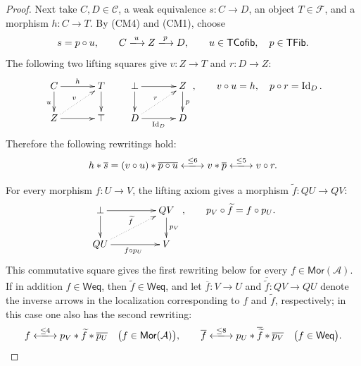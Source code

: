 \documentclass[10pt,a4paper]{amsart}
\theoremstyle{plain}
\theoremstyle{definition}
\theoremstyle{remark}
\begin{document}
\begin{proof}
  Next take $C,D \in \mathcal{C}$, a weak equivalence $s:C\longrightarrow D$, an object $T \in \mathcal{F}$, and a morphism $h:C\longrightarrow T$.
  By (CM4) and (CM1), choose
  \[
    s=p\circ u,\qquad C\xlongrightarrow{u}Z\xlongrightarrow{p}D,\qquad u\in \mathsf{TCofib},\quad p\in \mathsf{TFib}.
  \]
  The following two lifting squares give $v:Z\longrightarrow T$ and $r:D\longrightarrow Z$:
  \[
    \xymatrix@C=12mm@R=7mm{
    C\ar[r]^h\ar[d]_u&T\ar[d]\\
    Z\ar[r]\ar@{..>}[ur]^v&\top
    }
    \qquad
    \xymatrix@C=12mm@R=7mm{
    \bot\ar[r]\ar[d]&Z\ar[d]^p\\
    D\ar[r]_{\operatorname{Id}_D}\ar@{..>}[ur]^r&D
    },
    \qquad
    v\circ u=h,\quad p\circ r=\operatorname{Id}_D.
  \]
  Therefore the following rewritings hold:
  \begin{equation}\label{eq:model-weak-inverse-rewriting}
    h\ast\overline s
    =(v\circ u)\ast\overline{p\circ u}
    \xlongleftrightarrow{\leq6}
    v\ast\overline p
    \xlongleftrightarrow{\leq5}v\circ r.
  \end{equation}

  \medskip

  For every morphism $f:U\longrightarrow V$, the lifting axiom gives a morphism $\widetilde f:QU\longrightarrow QV$:
  \[
    \xymatrix@C=16mm@R=7mm{
    \bot\ar[r]\ar[d]&QV\ar[d]^{p_V}\\
    QU\ar[r]_{f\circ p_U}
    \ar@{..>}[ur]^{\widetilde f}&V
    },
    \qquad
    p_V\circ\widetilde f=f\circ p_U.
  \]
  This commutative square gives the first rewriting below for every $f\in\mathsf{Mor}(\mathcal A)$.
  If in addition $f\in\mathsf{Weq}$, then $\widetilde f\in\mathsf{Weq}$, and let $\overline f:V\longrightarrow U$ and $\overline{\widetilde f}:QV\longrightarrow QU$ denote the inverse arrows in the localization corresponding to $f$ and $\widetilde f$, respectively; in this case one also has the second rewriting:
  \begin{equation}\label{eq:model-cofibrant-arrow-rewriting}
    f\xlongleftrightarrow{\leq4} p_V\ast\widetilde f\ast\overline{p_U}
    \quad\bigl(f\in\mathsf{Mor}(\mathcal A)\bigr), \qquad
    \overline f\xlongleftrightarrow{\leq8}
    p_U\ast\overline{\widetilde f}\ast\overline{p_V}
    \quad\bigl(f\in\mathsf{Weq}\bigr).
  \end{equation}


\end{proof}
\end{document}
